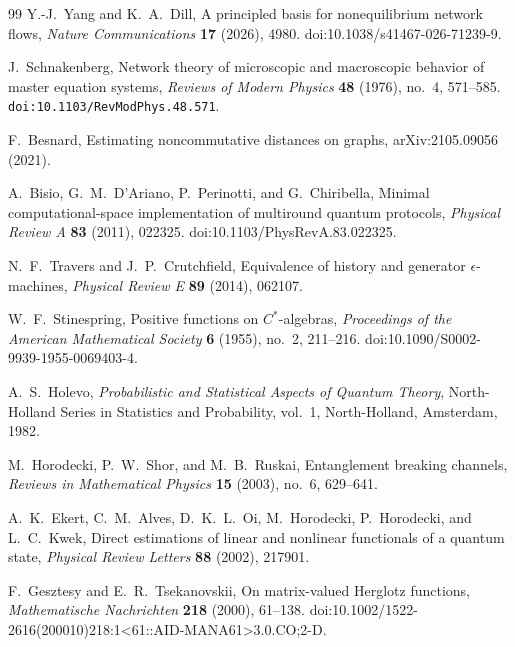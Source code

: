 \documentclass[11pt]{article}
\theoremstyle{definition}
\theoremstyle{remark}
\theoremstyle{definition}
\theoremstyle{remark}
\begin{document}
\begin{thebibliography}{99}
Y.-J.~Yang and K.~A.~Dill,
\newblock A principled basis for nonequilibrium network flows,
\newblock \emph{Nature Communications} \textbf{17} (2026), 4980.
\newblock doi:10.1038/s41467-026-71239-9.

J.~Schnakenberg,
\newblock Network theory of microscopic and macroscopic behavior of master equation systems,
\newblock \emph{Reviews of Modern Physics} \textbf{48} (1976), no.~4, 571--585.
\newblock \nolinkurl{doi:10.1103/RevModPhys.48.571}.

F.~Besnard,
\newblock Estimating noncommutative distances on graphs,
\newblock arXiv:2105.09056 (2021).

A.~Bisio, G.~M.~D'Ariano, P.~Perinotti, and G.~Chiribella,
\newblock Minimal computational-space implementation of multiround quantum protocols,
\newblock \emph{Physical Review A} \textbf{83} (2011), 022325.
\newblock doi:10.1103/PhysRevA.83.022325.

N.~F.~Travers and J.~P.~Crutchfield,
\newblock Equivalence of history and generator $\epsilon$-machines,
\newblock \emph{Physical Review E} \textbf{89} (2014), 062107.

W.~F.~Stinespring,
\newblock Positive functions on $C^*$-algebras,
\newblock \emph{Proceedings of the American Mathematical Society} \textbf{6}
(1955), no.~2, 211--216.
\newblock doi:10.1090/S0002-9939-1955-0069403-4.

A.~S.~Holevo,
\newblock \emph{Probabilistic and Statistical Aspects of Quantum Theory},
\newblock North-Holland Series in Statistics and Probability, vol.~1,
North-Holland, Amsterdam, 1982.

M.~Horodecki, P.~W.~Shor, and M.~B.~Ruskai,
\newblock Entanglement breaking channels,
\newblock \emph{Reviews in Mathematical Physics} \textbf{15} (2003), no.~6,
629--641.

A.~K.~Ekert, C.~M.~Alves, D.~K.~L.~Oi, M.~Horodecki, P.~Horodecki, and L.~C.~Kwek,
\newblock Direct estimations of linear and nonlinear functionals of a quantum state,
\newblock \emph{Physical Review Letters} \textbf{88} (2002), 217901.

F.~Gesztesy and E.~R.~Tsekanovskii,
\newblock On matrix-valued Herglotz functions,
\newblock \emph{Mathematische Nachrichten} \textbf{218} (2000), 61--138.
\newblock doi:10.1002/1522-2616(200010)218:1<61::AID-MANA61>3.0.CO;2-D.


\end{thebibliography}
\end{document}
